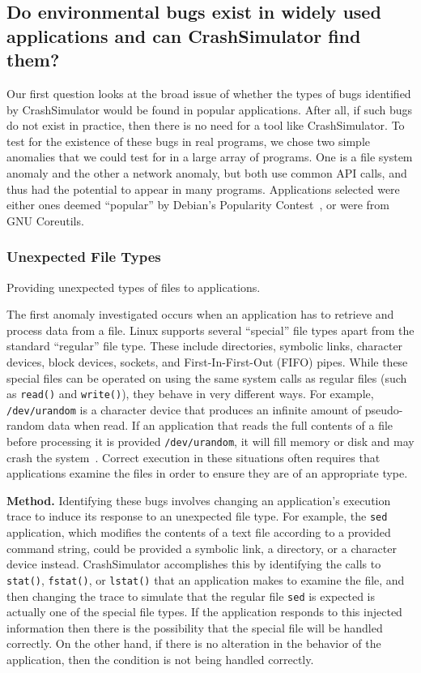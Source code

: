 \subsection{Do environmental bugs  exist in widely used applications and
can CrashSimulator find them?} \label{sec-env-bugs}

Our first question looks at the broad issue of whether the types of bugs
identified by CrashSimulator would be found in popular applications.  After
all, if such bugs do not exist in practice, then there is no need for a
tool like CrashSimulator.  To test for the existence of these bugs in real
programs, we chose two simple anomalies that we could test for in a large
array of programs.  One is a file system anomaly and the other a network
anomaly, but both use common API calls, and thus had the potential to
appear in many programs.  Applications selected were either ones deemed
``popular'' by Debian's Popularity Contest~\cite{DebPopCon}, or were from
GNU Coreutils.

\subsubsection{Unexpected File Types}
\label{sec-file-type-bugs}
Providing unexpected types of files to
applications.

The first anomaly investigated occurs when an application has to retrieve
and process data from a file.  Linux supports several ``special'' file
types apart from the standard ``regular'' file type.  These include
directories, symbolic links, character devices, block devices, sockets, and
First-In-First-Out (FIFO) pipes.  While these special files can be operated
on using the same system calls as regular files (such as {\tt read()} and
{\tt write()}), they behave in very different ways.  For example, {\tt
/dev/urandom} is a character device that produces an infinite amount of
pseudo-random data when read.  If an application that reads the full
contents of a file before processing it is provided {\tt /dev/urandom}, it
will fill memory or disk and may crash the system~\cite{YumAptEndless}.
Correct execution in these situations often requires that applications
examine the files in order to ensure they are of an appropriate type.

{\bf Method.}  Identifying these bugs involves changing an application's
execution trace to induce its response to an unexpected file type.  For
example, the {\tt sed} application, which modifies the contents of a text
file according to a provided command string, could be provided a symbolic
link, a directory, or a character device instead.  CrashSimulator
accomplishes this by identifying the calls to {\tt stat()}, {\tt fstat()},
or {\tt lstat()} that an application makes to examine the file, and then
changing the trace to simulate that the regular file {\tt sed} is expected
is actually one of the special file types.  If the application responds to
this injected information then there is the possibility that the special
file will be handled correctly.  On the other hand, if there is no
alteration in the behavior of the application,  then the condition is not
being handled correctly.


